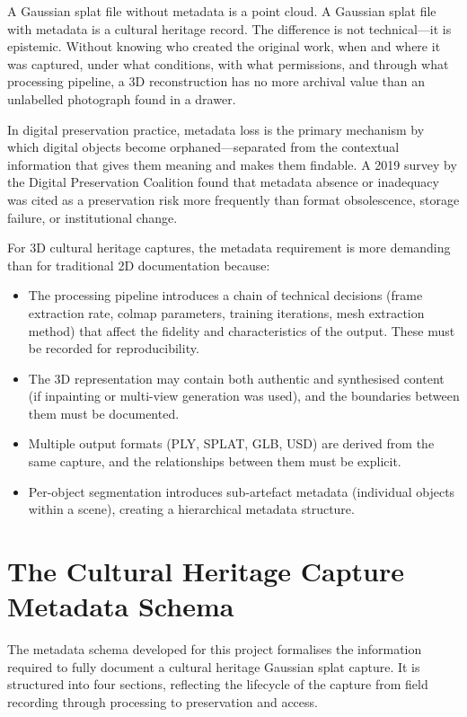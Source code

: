 A Gaussian splat file without metadata is a point cloud. A Gaussian splat file with metadata is a cultural heritage record. The difference is not technical---it is epistemic. Without knowing who created the original work, when and where it was captured, under what conditions, with what permissions, and through what processing pipeline, a 3D reconstruction has no more archival value than an unlabelled photograph found in a drawer.

\begin{keyfinding}
In digital preservation practice, metadata loss is the primary mechanism by which digital objects become orphaned---separated from the contextual information that gives them meaning and makes them findable. A 2019 survey by the Digital Preservation Coalition found that metadata absence or inadequacy was cited as a preservation risk more frequently than format obsolescence, storage failure, or institutional change.
\end{keyfinding}

For 3D cultural heritage captures, the metadata requirement is more demanding than for traditional 2D documentation because:

\begin{itemize}
  \item The processing pipeline introduces a chain of technical decisions (frame extraction rate, \acrshort{colmap} parameters, training iterations, mesh extraction method) that affect the fidelity and characteristics of the output. These must be recorded for reproducibility.
  \item The 3D representation may contain both authentic and synthesised content (if inpainting or multi-view generation was used), and the boundaries between them must be documented.
  \item Multiple output formats (PLY, SPLAT, GLB, USD) are derived from the same capture, and the relationships between them must be explicit.
  \item Per-object segmentation introduces sub-artefact metadata (individual objects within a scene), creating a hierarchical metadata structure.
\end{itemize}

\section{The Cultural Heritage Capture Metadata Schema}
\label{sec:meta-schema}

The metadata schema developed for this project formalises the information required to fully document a cultural heritage Gaussian splat capture. It is structured into four sections, reflecting the lifecycle of the capture from field recording through processing to preservation and access.

